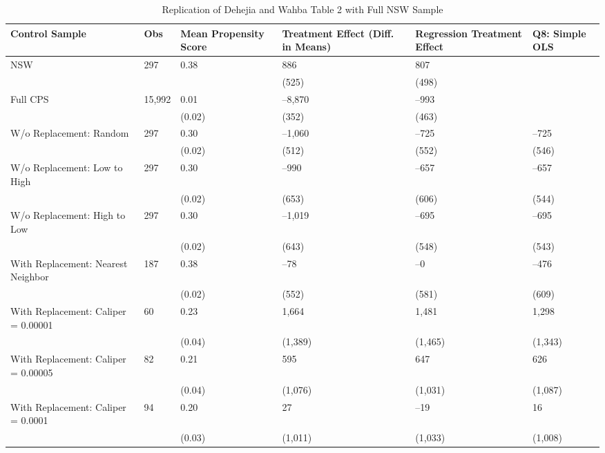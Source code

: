 \begin{table}[tbp] \centering
{}

\caption{Replication of Dehejia and Wahba Table 2 with Full NSW Sample}
\begin{tabularx}{\linewidth}{@{}lCCCCC@{}}

\toprule
{Control Sample}&{Obs}&{Mean Propensity Score}&{Treatment Effect (Diff. in Means)}&{Regression Treatment Effect}&{Q8: Simple OLS} \tabularnewline
\midrule \addlinespace[\belowrulesep]
NSW&297&0.38&886&807& \tabularnewline
&&&(525)&(498)& \tabularnewline
Full CPS&15,992&0.01&--8,870&--993& \tabularnewline
&&(0.02)&(352)&(463)& \tabularnewline
W/o Replacement: Random&297&0.30&--1,060&--725&--725 \tabularnewline
&&(0.02)&(512)&(552)&(546) \tabularnewline
W/o Replacement: Low to High&297&0.30&--990&--657&--657 \tabularnewline
&&(0.02)&(653)&(606)&(544) \tabularnewline
W/o Replacement: High to Low&297&0.30&--1,019&--695&--695 \tabularnewline
&&(0.02)&(643)&(548)&(543) \tabularnewline
With Replacement: Nearest Neighbor&187&0.38&--78&--0&--476 \tabularnewline
&&(0.02)&(552)&(581)&(609) \tabularnewline
With Replacement: Caliper = 0.00001&60&0.23&1,664&1,481&1,298 \tabularnewline
&&(0.04)&(1,389)&(1,465)&(1,343) \tabularnewline
With Replacement: Caliper = 0.00005&82&0.21&595&647&626 \tabularnewline
&&(0.04)&(1,076)&(1,031)&(1,087) \tabularnewline
With Replacement: Caliper = 0.0001&94&0.20&27&--19&16 \tabularnewline
&&(0.03)&(1,011)&(1,033)&(1,008) \tabularnewline
\bottomrule 

\end{tabularx}
\end{table}
